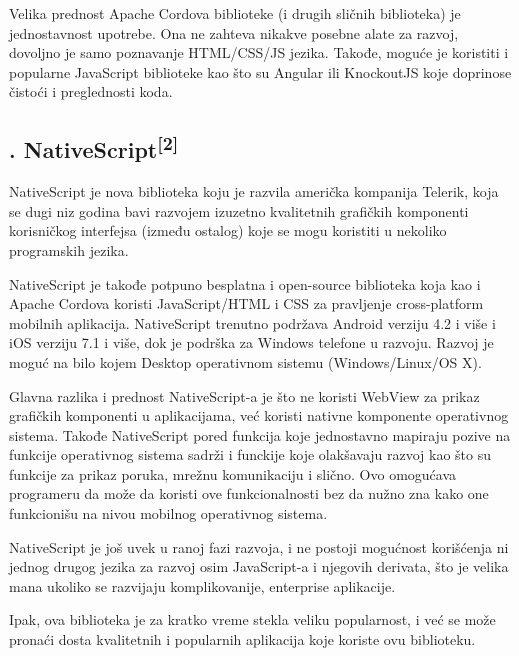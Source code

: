 \documentclass[a4paper]{article}
\begin{document}
Velika prednost Apache Cordova biblioteke (i drugih sličnih biblioteka)
je jednostavnost upotrebe. Ona ne zahteva nikakve posebne alate za
razvoj, dovoljno je samo poznavanje HTML/CSS/JS jezika. Takođe, moguće
je koristiti i popularne JavaScript biblioteke kao što su Angular ili
KnockoutJS koje doprinose čistoći i preglednosti koda.

\subsection[2.2. NativeScript[2{]}]{.
NativeScript\textsuperscript{[2]}}
\hypertarget{RefHeadingToc1171308303690}{}NativeScript je nova
biblioteka koju je razvila američka kompanija Telerik, koja se dugi niz
godina bavi razvojem izuzetno kvalitetnih grafičkih komponenti
korisničkog interfejsa (između ostalog) koje se mogu koristiti u
nekoliko programskih jezika.

NativeScript je takođe potpuno besplatna i open-source biblioteka koja
kao i Apache Cordova koristi JavaScript/HTML i CSS za pravljenje
cross-platform mobilnih aplikacija. NativeScript trenutno podržava
Android verziju 4.2 i više i iOS verziju 7.1 i više, dok je podrška za
Windows telefone u razvoju. Razvoj je moguć na bilo kojem Desktop
operativnom sistemu (Windows/Linux/OS X).

Glavna razlika i prednost NativeScript-a je što ne koristi WebView za
prikaz grafičkih komponenti u aplikacijama, već koristi nativne
komponente operativnog sistema. Takođe NativeScript pored funkcija koje
jednostavno mapiraju pozive na funkcije operativnog sistema sadrži i
funckije koje olakšavaju razvoj kao što su funkcije za prikaz poruka,
mrežnu komunikaciju i slično. Ovo omogućava programeru da može da
koristi ove funkcionalnosti bez da nužno zna kako one funkcionišu na
nivou mobilnog operativnog sistema.

NativeScript je još uvek u ranoj fazi razvoja, i ne postoji mogućnost
korišćenja ni jednog drugog jezika za razvoj osim JavaScript-a i
njegovih derivata, što je velika mana ukoliko se razvijaju
komplikovanije, enterprise aplikacije.

Ipak, ova biblioteka je za kratko vreme stekla veliku popularnost, i već
se može pronaći dosta kvalitetnih i popularnih aplikacija koje koriste
ovu biblioteku.
\end{document}
